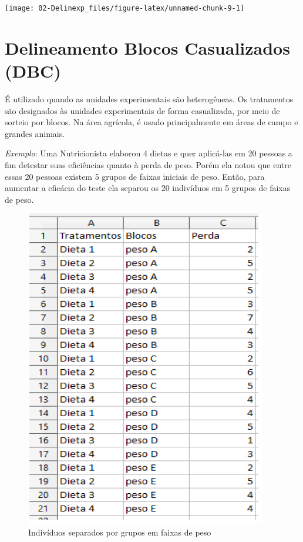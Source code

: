 \documentclass[12pt,brazil,oneside]{book}
\begin{document}
\begin{center}\texttt{[image: 02-Delinexp\_files/figure-latex/unnamed-chunk-9-1]} \end{center}

\hypertarget{delineamento-blocos-casualizados-dbc}{%
\section{Delineamento Blocos Casualizados
(DBC)}\label{delineamento-blocos-casualizados-dbc}}

É utilizado quando as unidades experimentais são heterogêneas. Os
tratamentos são designados às unidades experimentais de forma
casualizada, por meio de sorteio por blocos. Na área agrícola, é usado
principalmente em áreas de campo e grandes animais.

\emph{Exemplo}: Uma Nutricionista elaborou 4 dietas e quer aplicá-las em
20 pessoas a fim detestar suas eficiências quanto à perda de peso. Porém
ela notou que entre essas 20 pessoas existem 5 grupos de faixas iniciais
de peso. Então, para aumentar a eficácia do teste ela separou os 20
indivíduos em 5 grupos de faixas de peso.

\begin{figure}
\centering
\includegraphics{delimexp1.png}
\caption{Indivíduos separados por grupos em faixas de peso}
\end{figure}
\end{document}
